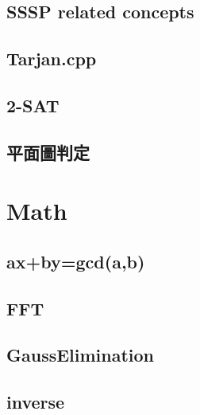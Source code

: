 	\subsection{SSSP related concepts}
		
	\subsection{Tarjan.cpp}
		
	\subsection{2-SAT}
		
	\subsection{平面圖判定}
		


\section{Math}
		
	\subsection{ax+by=gcd(a,b)}
		
%		
	\subsection{FFT}
		
%		
	\subsection{GaussElimination}
		
	\subsection{inverse}
		
%		
%		
